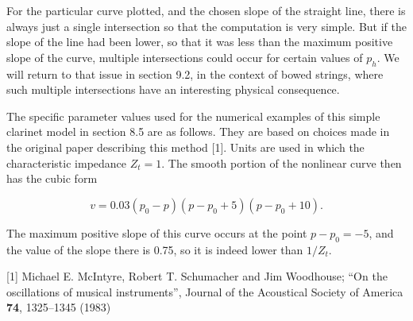 
  For the particular curve plotted, and the chosen slope of the straight line, 
  there is always just a single intersection so that the computation is very 
  simple. But if the slope of the line had been lower, so that it was less than 
  the maximum positive slope of the curve, multiple intersections could occur 
  for certain values of $p_h$. We will return to that issue in section 9.2, in 
  the context of bowed strings, where such multiple intersections have an 
  interesting physical consequence. 

  The specific parameter values used for the numerical examples of this simple 
  clarinet model in section 8.5 are as follows. They are based on choices made 
  in the original paper describing this method [1]. Units are used in which the 
  characteristic impedance $Z_t=1$. The smooth portion of the nonlinear curve 
  then has the cubic form 

  \begin{equation*}v=0.03(p_0 -p)(p-p_0+5)(p-p_0+10) . \tag{11}\end{equation*} 

  The maximum positive slope of this curve occurs at the point $p-p_0=-5$, and 
  the value of the slope there is 0.75, so it is indeed lower than $1/Z_t$. 

  \sectionreferences{}[1] Michael E. McIntyre, Robert T. Schumacher and Jim 
  Woodhouse; ``On the oscillations of musical instruments'', Journal of the 
  Acoustical Society of America \textbf{74}, 1325--1345 (1983) 